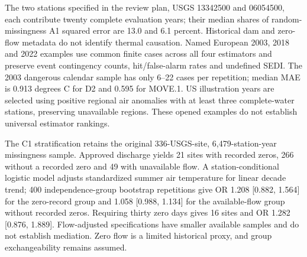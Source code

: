 \documentclass[draft]{agujournal2025}
\begin{document}
The two stations specified in the review plan, USGS 13342500 and 06054500, each contribute twenty complete evaluation years; their median shares of random-missingness A1 squared error are 13.0 and 6.1 percent. Historical dam and zero-flow metadata do not identify thermal causation. Named European 2003, 2018 and 2022 examples use common finite cases across all four estimators and preserve event contingency counts, hit/false-alarm rates and undefined SEDI. The 2003 dangerous calendar sample has only 6--22 cases per repetition; median MAE is 0.913 degrees C for D2 and 0.595 for MOVE.1. US illustration years are selected using positive regional air anomalies with at least three complete-water stations, preserving unavailable regions. These opened examples do not establish universal estimator rankings.

The C1 stratification retains the original 336-USGS-site, 6,479-station-year missingness sample. Approved discharge yields 21 sites with recorded zeros, 266 without a recorded zero and 49 with unavailable flow. A station-conditional logistic model adjusts standardized summer air temperature for linear decade trend; 400 independence-group bootstrap repetitions give OR 1.208 [0.882, 1.564] for the zero-record group and 1.058 [0.988, 1.134] for the available-flow group without recorded zeros. Requiring thirty zero days gives 16 sites and OR 1.282 [0.876, 1.889]. Flow-adjusted specifications have smaller available samples and do not establish mediation. Zero flow is a limited historical proxy, and group exchangeability remains assumed.





\end{document}
